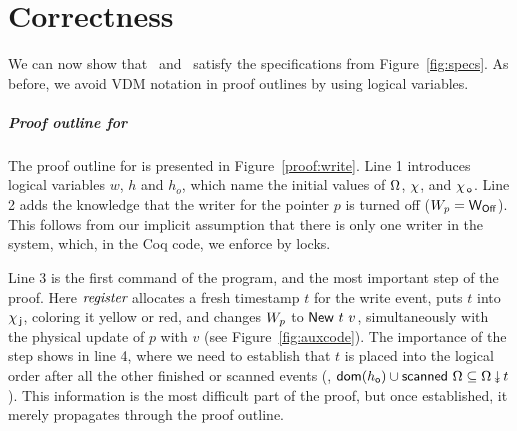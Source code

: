 \section{Correctness}
\label{sc:proof}

\def\botLGY{{\ensuremath{\mathsf{fwdLastGY}}}}
\def\histLGY{{\ensuremath{\mathsf{lastGYHist}}}}
\def\greenH{{\ensuremath{\mathsf{green\_prefix}}}}
\newcommand{\spz}{S_z}



We can now show that \jywrite\ and \jyscan\ satisfy the specifications
from Figure~\ref{fig:specs}.  As before, we avoid VDM notation in
proof outlines by using logical variables.
%
%
%
%
%
%


\subparagraph*{Proof outline for \jywrite}
%
The proof outline for \jywrite is presented in
Figure~\ref{proof:write}.
%
Line 1 introduces logical variables $w$, $h$ and $h_o$, which name the
initial values of $\Omega$, $\chi$, and $\chi_{\, \mathsf{o}}$.
%
Line 2 adds the knowledge that the writer for the pointer $p$ is
turned off ($W_p = \mathsf{W_{Off}}$). This follows from our implicit
assumption that there is only one writer in the system, which, in the
Coq code, we enforce by locks.

Line 3 is the first command of the program, and the most important
step of the proof. Here $\textit{register}$ allocates a fresh timestamp
$t$ for the write event, puts $t$ into $\chi_{\, \mathsf{j}}$, coloring it yellow or
red, and changes $W_p$ to $\mathsf{New}\ t\ v$, simultaneously with the
physical update of $p$ with $v$ (see Figure~\ref{fig:auxcode}). The
importance of the step shows in line 4, where we need to establish
that $t$ is placed into the logical order after all the other finished
or scanned events (\ie, $ \dom{h_\othersub} \cup \scanned\,
\stableorder \subseteq \sideal{\stableorder}{t}$). This information is
the most difficult part of the proof, but once established, it merely
propagates through the proof outline.

